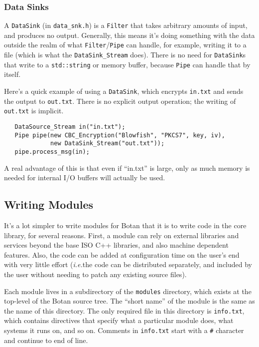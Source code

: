\documentclass{article}
\newcommand{\filename}[1]{\texttt{#1}}
\newcommand{\type}[1]{\texttt{#1}}
\newcommand{\ie}[0]{\emph{i.e.}}
\begin{document}
\subsubsection{Data Sinks}

A \type{DataSink} (in \filename{data\_snk.h}) is a \type{Filter} that takes
arbitrary amounts of input, and produces no output. Generally, this means it's
doing something with the data outside the realm of what
\type{Filter}/\type{Pipe} can handle, for example, writing it to a file (which
is what the \type{DataSink\_Stream} does). There is no need for
\type{DataSink}s that write to a \type{std::string} or memory buffer, because
\type{Pipe} can handle that by itself.

Here's a quick example of using a \type{DataSink}, which encrypts
\filename{in.txt} and sends the output to \filename{out.txt}. There is
no explicit output operation; the writing of \filename{out.txt} is
implicit.

\begin{verbatim}
   DataSource_Stream in("in.txt");
   Pipe pipe(new CBC_Encryption("Blowfish", "PKCS7", key, iv),
             new DataSink_Stream("out.txt"));
   pipe.process_msg(in);
\end{verbatim}

A real advantage of this is that even if ``in.txt'' is large, only as
much memory is needed for internal I/O buffers will actually be used.

\subsection{Writing Modules}

It's a lot simpler to write modules for Botan that it is to write code
in the core library, for several reasons. First, a module can rely on
external libraries and services beyond the base ISO C++ libraries, and
also machine dependent features. Also, the code can be added at
configuration time on the user's end with very little effort (\ie the
code can be distributed separately, and included by the user without
needing to patch any existing source files).

Each module lives in a subdirectory of the \filename{modules}
directory, which exists at the top-level of the Botan source tree. The
``short name'' of the module is the same as the name of this
directory. The only required file in this directory is
\filename{info.txt}, which contains directives that specify what a
particular module does, what systems it runs on, and so on. Comments
in \filename{info.txt} start with a \verb|#| character and continue
to end of line.
\end{document}
